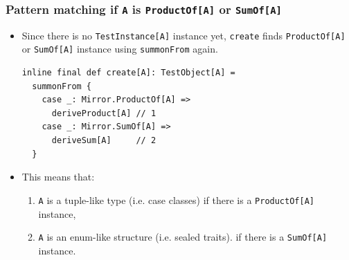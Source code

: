 \begin{frame}[fragile]
\end{frame}

\begin{frame}[fragile]
  \frametitle{ Pattern matching if \lstinline|A| is \lstinline|ProductOf[A]| or \lstinline|SumOf[A]|}

  \begin{itemize}
    \item<+-> Since there is no \lstinline|TestInstance[A]| instance yet,
    \lstinline|create| finds \lstinline|ProductOf[A]| or \lstinline|SumOf[A]|
    instance using \lstinline|summonFrom| again.
\begin{lstlisting}[style=scala]
inline final def create[A]: TestObject[A] =
  summonFrom {
    case _: Mirror.ProductOf[A] =>
      deriveProduct[A] // 1
    case _: Mirror.SumOf[A] =>
      deriveSum[A]     // 2
  }
\end{lstlisting}

    \item<+-> This means that:
    \begin{enumerate}
      \item \lstinline|A| is a tuple-like type (i.e. case classes)
      if there is a \lstinline|ProductOf[A]| instance,
      \item \lstinline|A| is an enum-like structure (i.e. sealed traits).
      if there is a \lstinline|SumOf[A]| instance.
    \end{enumerate}
  \end{itemize}

\end{frame}

